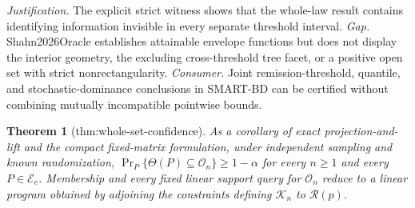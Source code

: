 \documentclass{article}
\newtheorem{theorem}{Theorem}
\begin{document}
\par\smallskip\noindent \textit{Justification.} The explicit strict witness shows that the whole-law result contains identifying information invisible in every separate threshold interval. \textit{Gap.} Shahn2026Oracle establishes attainable envelope functions but does not display the interior geometry, the excluding cross-threshold tree facet, or a positive open set with strict nonrectangularity. \textit{Consumer.} Joint remission-threshold, quantile, and stochastic-dominance conclusions in SMART-BD can be certified without combining mutually incompatible pointwise bounds.

\begin{theorem}[thm:whole-set-confidence]\label{thm:whole-set-confidence}
As a corollary of exact projection-and-lift and the compact fixed-matrix formulation, under independent sampling and known randomization, \(\Pr_P\{\Theta(P)\subseteq\mathcal O_n\}\geq1-\alpha\) for every \(n\geq1\) and every \(P\in\mathcal E_e\). Membership and every fixed linear support query for \(\mathcal O_n\) reduce to a linear program obtained by adjoining the constraints defining \(\mathcal K_n\) to \(\mathcal R(p)\).
\end{theorem}
\end{document}
